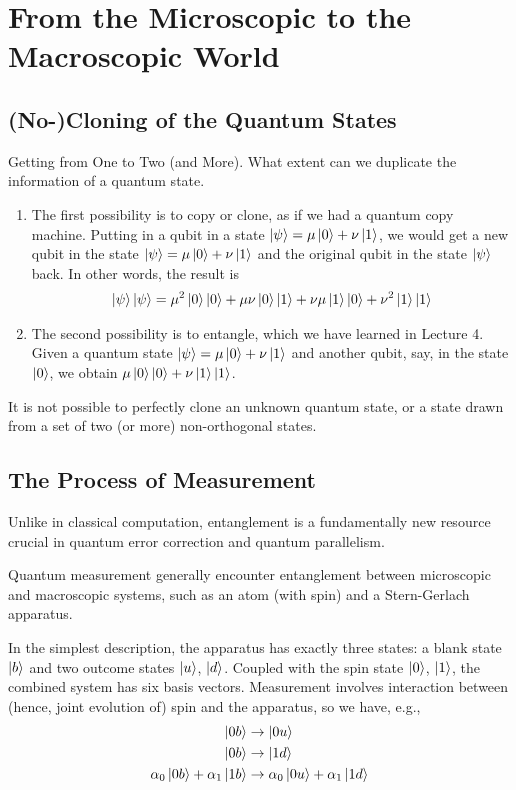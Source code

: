 \newpage
\section{From the Microscopic to the Macroscopic World}

\subsection{(No-)Cloning of the Quantum States}
Getting from One to Two (and More). What extent can we duplicate the information of a quantum state.
\begin{enumerate}
    \item The first possibility is to copy or clone, as if we had a quantum copy machine. Putting in a qubit in a state $\ket{\psi}=\mu\ket{0}+\nu\ket{1}$, we would get a new qubit in the state $\ket{\psi}=\mu\ket{0}+\nu\ket{1}$ and the original qubit in the state $\ket{\psi}$ back. In other words, the result is
    \begin{align*}
        \ket{\psi}\ket{\psi}=\mu^2\ket{0}\ket{0}+\mu\nu\ket{0}\ket{1}+\nu\mu\ket{1}\ket{0}+\nu^2\ket{1}\ket{1}
    \end{align*}
    \item The second possibility is to entangle, which we have learned in Lecture 4. Given a quantum state $\ket{\psi}=\mu\ket{0}+\nu\ket{1}$ and another qubit, say, in the state $\ket{0}$, we obtain $\mu\ket{0}\ket{0}+\nu\ket{1}\ket{1}$. 
\end{enumerate}

\begin{theorem}\quad 

    It is not possible to perfectly clone an unknown quantum state, or a state drawn from a set of two (or more) non-orthogonal states.
\end{theorem}

\subsection{The Process of Measurement}
Unlike in classical computation, entanglement is a fundamentally new resource crucial in quantum error correction and quantum parallelism.

Quantum measurement generally encounter entanglement between microscopic and macroscopic systems, such as an atom (with spin) and a Stern-Gerlach apparatus. 

In the simplest description, the apparatus has exactly three states: a blank state $\ket{b}$ and two outcome states $\ket{u}$, $\ket{d}$. Coupled with the spin state $\ket{0}$, $\ket{1}$, the combined system has six basis vectors. Measurement involves interaction between (hence, joint evolution of) spin and the apparatus, so we have, e.g.,
\begin{align*}
    \ket{0b}&\rightarrow\ket{0u}\\
    \ket{0b}&\rightarrow\ket{1d}\\
    \alpha_0\ket{0b}+\alpha_1\ket{1b}&\rightarrow\alpha_0\ket{0u}+\alpha_1\ket{1d}
\end{align*}

